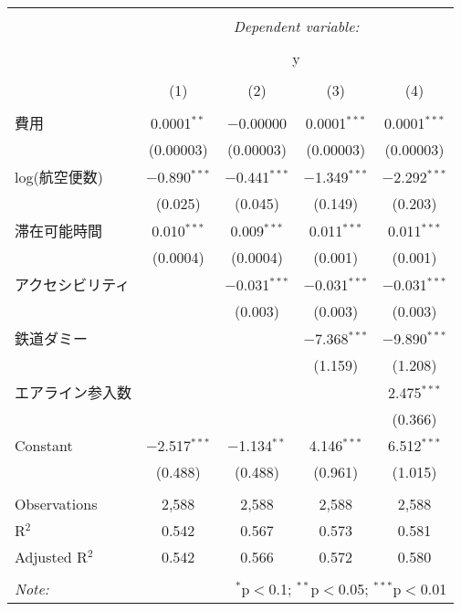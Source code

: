 \documentclass{jsarticle}
\begin{document}
\begin{table}[!htbp] \centering 
  \caption{} 
  \label{} 
\begin{tabular}{@{\extracolsep{5pt}}lcccc} 
\\[-1.8ex]\hline 
\hline \\[-1.8ex] 
 & \multicolumn{4}{c}{\textit{Dependent variable:}} \\ 
\cline{2-5} 
\\[-1.8ex] & \multicolumn{4}{c}{y} \\ 
\\[-1.8ex] & (1) & (2) & (3) & (4)\\ 
\hline \\[-1.8ex] 
 費用 & 0.0001$^{**}$ & $-$0.00000 & 0.0001$^{***}$ & 0.0001$^{***}$ \\ 
  & (0.00003) & (0.00003) & (0.00003) & (0.00003) \\ 
  log(航空便数) & $-$0.890$^{***}$ & $-$0.441$^{***}$ & $-$1.349$^{***}$ & $-$2.292$^{***}$ \\ 
  & (0.025) & (0.045) & (0.149) & (0.203) \\ 
  滞在可能時間 & 0.010$^{***}$ & 0.009$^{***}$ & 0.011$^{***}$ & 0.011$^{***}$ \\ 
  & (0.0004) & (0.0004) & (0.001) & (0.001) \\ 
  アクセシビリティ &  & $-$0.031$^{***}$ & $-$0.031$^{***}$ & $-$0.031$^{***}$ \\ 
  &  & (0.003) & (0.003) & (0.003) \\ 
  鉄道ダミー &  &  & $-$7.368$^{***}$ & $-$9.890$^{***}$ \\ 
  &  &  & (1.159) & (1.208) \\ 
  エアライン参入数 &  &  &  & 2.475$^{***}$ \\ 
  &  &  &  & (0.366) \\ 
  Constant & $-$2.517$^{***}$ & $-$1.134$^{**}$ & 4.146$^{***}$ & 6.512$^{***}$ \\ 
  & (0.488) & (0.488) & (0.961) & (1.015) \\ 
 \hline \\[-1.8ex] 
Observations & 2,588 & 2,588 & 2,588 & 2,588 \\ 
R$^{2}$ & 0.542 & 0.567 & 0.573 & 0.581 \\ 
Adjusted R$^{2}$ & 0.542 & 0.566 & 0.572 & 0.580 \\ 
\hline 
\hline \\[-1.8ex] 
\textit{Note:}  & \multicolumn{4}{r}{$^{*}$p$<$0.1; $^{**}$p$<$0.05; $^{***}$p$<$0.01} \\ 
\end{tabular} 
\end{table}
\end{document}
